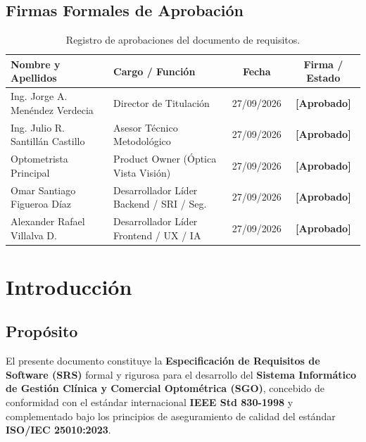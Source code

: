 \documentclass[12pt,a4paper]{report}
\begin{document}
\section*{Firmas Formales de Aprobación}
\begin{table}[H]
\centering
\small
\begin{tabularx}{\textwidth}{|L{4.2cm}|L{4.5cm}|c|c|}
\hline
{}\color{white}\textbf{Nombre y Apellidos} & \color{white}\textbf{Cargo / Función} & \color{white}\textbf{Fecha} & \color{white}\textbf{Firma / Estado} \\
\hline
Ing. Jorge A. Menéndez Verdecia & Director de Titulación & 27/09/2026 & \textbf{[Aprobado]} \\
\hline
Ing. Julio R. Santillán Castillo & Asesor Técnico Metodológico & 27/09/2026 & \textbf{[Aprobado]} \\
\hline
Optometrista Principal & Product Owner (Óptica Vista Visión) & 27/09/2026 & \textbf{[Aprobado]} \\
\hline
Omar Santiago Figueroa Díaz & Desarrollador Líder Backend / SRI / Seg. & 27/09/2026 & \textbf{[Aprobado]} \\
\hline
Alexander Rafael Villalva D. & Desarrollador Líder Frontend / UX / IA & 27/09/2026 & \textbf{[Aprobado]} \\
\hline
\end{tabularx}
\caption{Registro de aprobaciones del documento de requisitos.}
\end{table}

\newpage
\tableofcontents
\newpage

\chapter{Introducción}

\section{Propósito}
El presente documento constituye la \textbf{Especificación de Requisitos de Software (SRS)} formal y rigurosa para el desarrollo del \textbf{Sistema Informático de Gestión Clínica y Comercial Optométrica (SGO)}, concebido de conformidad con el estándar internacional \textbf{IEEE Std 830-1998} y complementado bajo los principios de aseguramiento de calidad del estándar \textbf{ISO/IEC 25010:2023}.
\end{document}
